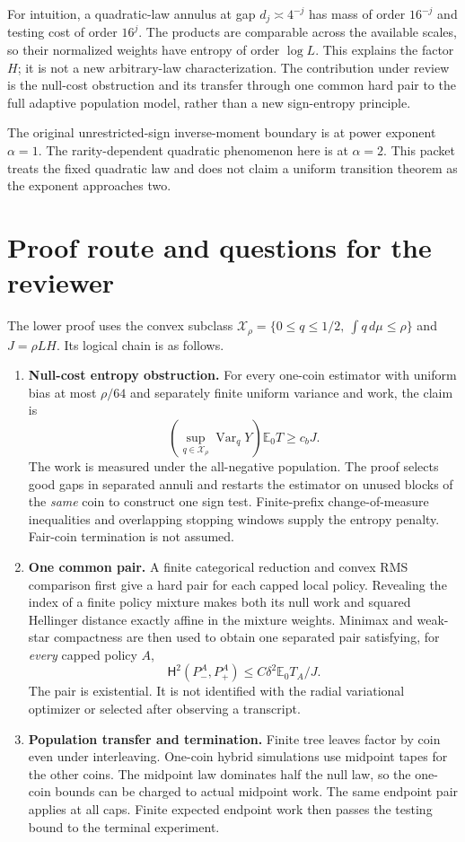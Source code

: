 \documentclass[11pt]{article}
\newcommand{\E}{\mathbb E}
\newcommand{\Var}{\operatorname{Var}}
\begin{document}
For intuition, a quadratic-law annulus at gap $d_j\asymp4^{-j}$ has mass
of order $16^{-j}$ and testing cost of order $16^j$. The products are
comparable across the available scales, so their normalized weights have
entropy of order $\log L$. This explains the factor $H$; it is not a new
arbitrary-law characterization. The contribution under review is the
null-cost obstruction and its transfer through one common hard pair to
the full adaptive population model, rather than a new sign-entropy principle.

The original unrestricted-sign inverse-moment boundary is at power exponent
$\alpha=1$. The rarity-dependent quadratic phenomenon here is at
$\alpha=2$. This packet treats the fixed quadratic law and does not claim
a uniform transition theorem as the exponent approaches two.

\clearpage
\section*{Proof route and questions for the reviewer}

The lower proof uses the convex subclass
$\mathcal X_\rho=\{0\le q\le1/2,\ \int q\,d\mu\le\rho\}$ and
$J=\rho LH$. Its logical chain is as follows.

\begin{enumerate}
\item \textbf{Null-cost entropy obstruction.} For every one-coin estimator
with uniform bias at most $\rho/64$ and separately finite uniform variance
and work, the claim is
\[
 \left(\sup_{q\in\mathcal X_\rho}\Var_qY\right)\E_0T\ge c_bJ.
\]
The work is measured under the all-negative population. The proof selects
good gaps in separated annuli and restarts the estimator on unused blocks
of the \emph{same} coin to construct one sign test. Finite-prefix
change-of-measure inequalities and overlapping stopping windows supply the
entropy penalty. Fair-coin termination is not assumed.

\item \textbf{One common pair.} A finite categorical reduction and convex
RMS comparison first give a hard pair for each capped local policy.
Revealing the index of a finite policy mixture makes both its null work
and squared Hellinger distance exactly affine in the mixture weights.
Minimax and weak-star compactness are then used to obtain one separated
pair satisfying, for \emph{every} capped policy $A$,
\[
 \mathsf H^2(P^A_-,P^A_+)\le C\delta^2\E_0T_A/J.
\]
The pair is existential. It is not identified with the radial variational
optimizer or selected after observing a transcript.

\item \textbf{Population transfer and termination.} Finite tree leaves
factor by coin even under interleaving. One-coin hybrid simulations use
midpoint tapes for the other coins. The midpoint law dominates half the
null law, so the one-coin bounds can be charged to actual midpoint work.
The same endpoint pair applies at all caps. Finite expected endpoint work
then passes the testing bound to the terminal experiment.
\end{enumerate}
\end{document}
